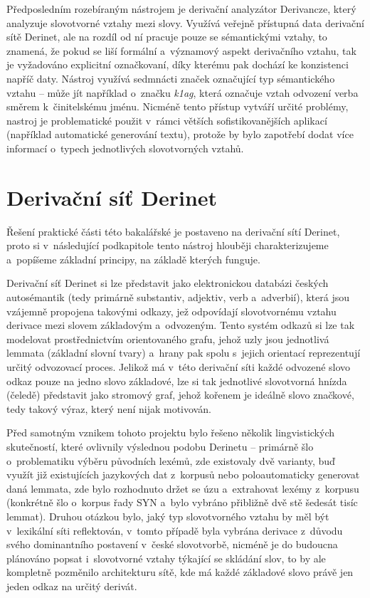 Předposledním rozebíraným nástrojem je derivační analyzátor Derivancze,
který analyzuje slovotvorné vztahy mezi slovy. Využívá veřejně přístupná
data derivační sítě Derinet, ale na rozdíl od ní pracuje pouze se
sémantickými vztahy, to znamená, že pokud se liší formální a~významový
aspekt derivačního vztahu, tak je vyžadováno explicitní označkovaní,
díky kterému pak dochází ke konzistenci napříč daty. Nástroj využívá
sedmnácti značek označující typ sémantického vztahu -- může jít
například o~značku \emph{k1ag}, která označuje vztah odvození verba
směrem k~činitelskému jménu. Nicméně tento přístup vytváří určité
problémy, nastroj je problematické použit v~rámci větších
sofistikovanějších aplikací (například automatické generování textu),
protože by bylo zapotřebí dodat více informací o~typech jednotlivých
slovotvorných vztahů.~\parencite{derivancze}

\hypertarget{derivaux10dnuxed-suxedux165-derinet}{%
\section{Derivační síť
Derinet}\label{derivaux10dnuxed-suxedux165-derinet}}

Řešení praktické části této bakalářské je postaveno na derivační sítí
Derinet, proto si v~následující podkapitole tento nástroj hlouběji
charakterizujeme a~popíšeme základní principy, na základě kterých
funguje.

Derivační síť Derinet si lze představit jako elektronickou databázi
českých autosémantik (tedy primárně substantiv, adjektiv, verb
a~adverbií), která jsou vzájemně propojena takovými odkazy, jež odpovídají
slovotvornému vztahu derivace mezi slovem základovým a~odvozeným. Tento
systém odkazů si lze tak modelovat prostřednictvím orientovaného grafu,
jehož uzly jsou jednotlivá lemmata (základní slovní tvary) a~hrany pak
spolu s~jejich orientací reprezentují určitý odvozovací proces. Jelikož
má v~této derivační síti každé odvozené slovo odkaz pouze na jedno slovo
základové, lze si tak jednotlivé slovotvorná hnízda (čeledě) představit
jako stromový graf, jehož kořenem je ideálně slovo značkové, tedy takový
výraz, který není nijak motivován.~\parencite{derinet-cz}

Před samotným vznikem tohoto projektu bylo řešeno několik lingvistických
skutečností, které ovlivnily výslednou podobu Derinetu -- primárně šlo
o~problematiku výběru původních lexémů, zde existovaly dvě varianty, buď
využít již existujících jazykových dat z~korpusů nebo poloautomaticky
generovat daná lemmata, zde bylo rozhodnuto držet se úzu a~extrahovat
lexémy z~korpusu (konkrétně šlo o~korpus řady SYN a~bylo vybráno
přibližně dvě stě šedesát tisíc lemmat). Druhou otázkou bylo, jaký typ
slovotvorného vztahu by měl být v~lexikální síti reflektován, v~tomto
případě byla vybrána derivace z~důvodu svého dominantního postavení
v~české slovotvorbě, nicméně je do budoucna plánováno popsat i~slovotvorné
vztahy týkající se skládání slov, to by ale kompletně pozměnilo
architekturu sítě, kde má každé základové slovo právě jen jeden odkaz na
určitý derivát.~\parencite{sevcikova14}

